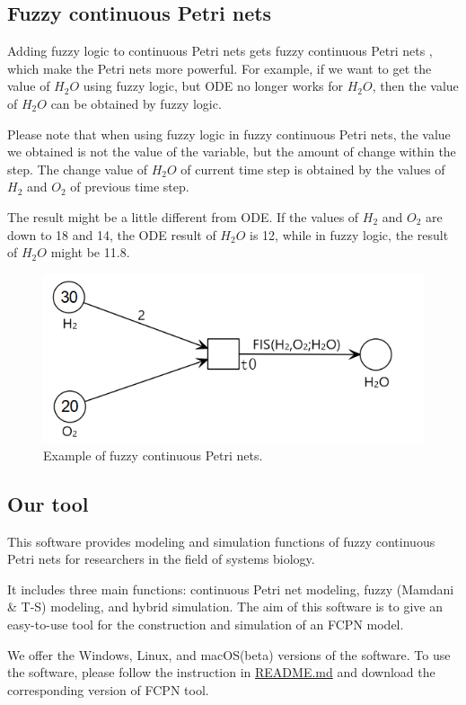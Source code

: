 \documentclass[journal,a4paper,onecolumn]{article}
\begin{document}
\subsection{Fuzzy continuous Petri nets}
Adding fuzzy logic to continuous Petri nets gets fuzzy continuous Petri nets \cite{LHG18}, which make the Petri nets more powerful. For example, if we want to get the value of $H_2O$ using fuzzy logic, but ODE no longer works for $H_2O$, then the value of $H_2O$ can be obtained by fuzzy logic. 

Please note that when using fuzzy logic in fuzzy continuous Petri nets, the value we obtained is not the value of the variable, but the amount of change within the step. The change value of $H_2O$ of current time step is obtained by the values of $H_2$ and $O_2$ of previous time step. 

The result might be a little different from ODE. If the values of $H_2$ and $O_2$ are down to 18 and 14, the ODE result of $H_2O$ is 12, while in fuzzy logic, the result of $H_2O$ might be 11.8. 
\begin{figure}[!hbt]
	\begin{center}
		\includegraphics[width=0.5\columnwidth]{fig50}
		\caption{Example of fuzzy continuous Petri nets.}
		\label{fig:Example of fuzzy continuous Petri nets}
	\end{center}
\end{figure}


\subsection{Our tool}

This software provides modeling and simulation functions of fuzzy continuous Petri nets for researchers in the field of systems biology.

It includes three main functions: continuous Petri net modeling, fuzzy (Mamdani \& T-S) modeling, and hybrid simulation. 
The aim of this software is to give an easy-to-use tool for the construction and simulation of an FCPN model.


We offer the Windows, Linux, and macOS(beta) versions of the software. To use the software, please follow the instruction in \href{https://github.com/liufei2016/fcpn/blob/master/README.md}{README.md} and download the corresponding version of FCPN tool.
\end{document}
